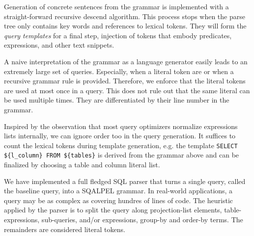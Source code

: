 \documentclass{cidr-2019}
\begin{document}
Generation of concrete sentences from the grammar is implemented with
a straight-forward recursive descend algorithm. This process stops
when the parse tree only contains key words and references to lexical tokens.
They will form the \emph{ query templates} for a final step, injection of tokens 
that embody predicates, expressions, and other text snippets.

A naive interpretation of the grammar as a language generator easily leads to an
extremely large set of queries. Especially, when a literal token are
or when a recursive grammar rule is provided.  Therefore, we
enforce that the literal tokens are used at most once in a query. This does not
rule out that the same literal  can be used multiple times. They are
differentiated by their line number in the grammar. 

Inspired by the observation that most query optimizers normalize expressions
lists internally, we can ignore order too in the query generation. It suffices to count the lexical tokens during template generation, e.g. the template \verb~SELECT ${l_column} FROM ${tables}~ is derived
from the grammar above and can be finalized by choosing a table and column
literal list. 




We have implemented a full fledged SQL parser that turns a single query, called the baseline query, into a {\sc SQALPEL} grammar. In real-world applications, a query may be as complex  as 
covering hundres of lines of code.
The heuristic applied by the parser is to split the query along projection-list elements, table-expressions, sub-queries, and/or expressions, group-by and order-by terms. The remainders are considered literal tokens.
\end{document}

